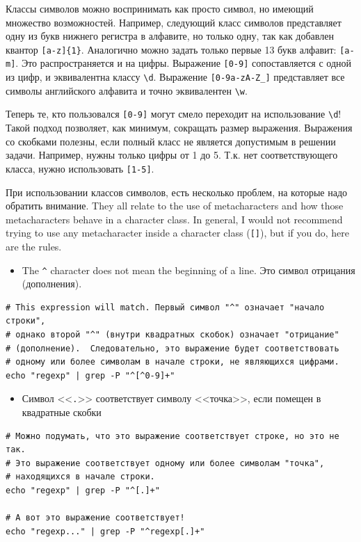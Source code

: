 \documentclass[12pt]{article}
\providecommand{\tightlist}{%
  \setlength{\itemsep}{0pt}\setlength{\parskip}{0pt}}
\begin{document}
Классы символов можно воспринимать как просто символ, но имеющий
множество возможностей. Например, следующий класс символов представляет
одну из букв нижнего регистра в алфавите, но только одну, так как
добавлен квантор \texttt{{[}a-z{]}\{1\}}. Аналогично можно задать только
первые 13 букв алфавит: \texttt{{[}a-m{]}}. Это распространяется и на
цифры. Выражение \texttt{{[}0-9{]}} сопоставляется с одной из цифр, и
эквивалентна классу \texttt{\textbackslash{}d}. Выражение
\texttt{{[}0-9a-zA-Z\_{]}} представляет все символы английского алфавита
и точно эквивалентен \texttt{\textbackslash{}w}.

Теперь те, кто пользовался \texttt{{[}0-9{]}} могут смело переходит на
использование \texttt{\textbackslash{}d}! Такой подход позволяет, как
минимум, сокращать размер выражения. Выражения со скобками полезны, если
полный класс не является допустимым в решении задачи. Например, нужны
только цифры от 1 до 5. Т.к. нет соответствующего класса, нужно
использовать \texttt{{[}1-5{]}}.

При использовании классов символов, есть несколько проблем, на которые
надо обратить внимание. They all relate to the use of metacharacters and
how those metacharacters behave in a character class. In general, I
would not recommend trying to use any metacharacter inside a character
class (\texttt{{[}{]}}), but if you do, here are the rules.

\begin{itemize}
\tightlist
\item
  The \texttt{\^{}} character does not mean the beginning of a line. Это
  символ отрицания (дополнения).
\end{itemize}

\begin{verbatim}
# This expression will match. Первый символ "^" означает "начало строки",
# однако второй "^" (внутри квадратных скобок) означает "отрицание"
# (дополнение).  Следовательно, это выражение будет соответствовать
# одному или более символам в начале строки, не являющихся цифрами.
echo "regexp" | grep -P "^[^0-9]+"
\end{verbatim}

\begin{itemize}
\tightlist
\item
  Символ <<\texttt{.}>> соответствует символу <<точка>>, если помещен в
  квадратные скобки
\end{itemize}

\begin{verbatim}
# Можно подумать, что это выражение соответствует строке, но это не так.
# Это выражение соответствует одному или более символам "точка",
# находящихся в начале строки.
echo "regexp" | grep -P "^[.]+"

# А вот это выражение соответствует!
echo "regexp..." | grep -P "^regexp[.]+"
\end{verbatim}
\end{document}
